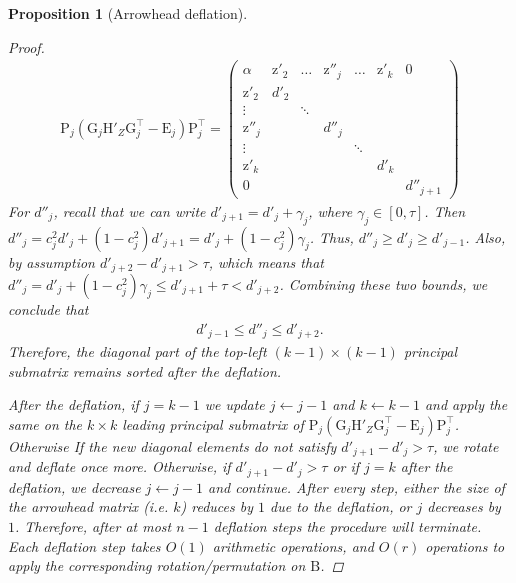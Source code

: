 \documentclass{article}
\newtheorem{proposition}{Proposition}[section]
\newcommand\vecz{\boldsymbol{\mathrm{z}}}
\newcommand\matB{\boldsymbol{\mathrm{B}}}
\newcommand\matE{\boldsymbol{\mathrm{E}}}
\newcommand\matG{\boldsymbol{\mathrm{G}}}
\newcommand\matH{\boldsymbol{\mathrm{H}}}
\newcommand\matP{\boldsymbol{\mathrm{P}}}
\begin{document}
\begin{proposition}[Arrowhead deflation]
\begin{proof}
        \begin{align*}
            \matP_{j}(\matG_j\matH'_Z\matG_j^\top - \matE_j)\matP_j^\top
            =
            \begin{pmatrix}
                \alpha & \vecz'_2 & \ldots & \vecz''_j & \ldots & \vecz'_k & 0
                \\
                \vecz'_2 & d'_2 &  &  &  & &
                \\
                \vdots &  & \ddots &  &  & &
                \\
                \vecz''_j &  &  & d''_j & & &
                \\
                \vdots &  &  &  &\ddots&   &
                \\
                \vecz'_{k} &  &  &  &&d'_{k} &
                \\
                0 &  &  &  & & & d''_{j+1}
            \end{pmatrix}
        \end{align*}
        For $d''_j$, recall that we can write $d'_{j+1}=d'_j+\gamma_j$, where $\gamma_j\in[0,\tau]$. Then $d''_j = c_j^2 d'_j + (1-c_j^2)d'_{j+1} = d'_j+(1-c_j^2)\gamma_j$. 
        Thus, $d''_j\geq d'_j\geq d'_{j-1}$. Also, by assumption $d'_{j+2}-d'_{j+1}>\tau$, which means that $d''_j =  d'_j+(1-c_j^2)\gamma_j \leq d'_{j+1}+\tau < d'_{j+2}$. Combining these two bounds, we conclude that \begin{align*}
            d'_{j-1}\leq d''_{j} \leq d'_{j+2}.
        \end{align*}
        Therefore, the diagonal part of the top-left $(k-1)\times(k-1)$ principal submatrix remains sorted after the deflation.
        
        After the deflation, if $j=k-1$ we update $j\leftarrow j-1$ and $k\leftarrow k-1$ and apply the same on the $k\times k$ leading principal submatrix of $\matP_{j}(\matG_j\matH'_Z\matG_j^\top - \matE_j)\matP_j^\top$. Otherwise  If the new diagonal elements do not satisfy $d'_{j+1}-d'_j>\tau$, we rotate and deflate once more. Otherwise, if $d'_{j+1}-d'_j>\tau$ or if $j=k$ after the deflation, we decrease $j\leftarrow j-1$ and continue. After every step, either the size of the arrowhead matrix (i.e. $k$) reduces by $1$ due to the deflation, or $j$ decreases by $1$. Therefore, after at most $n-1$ deflation steps the procedure will terminate. Each deflation step takes $O(1)$ arithmetic operations, and $O(r)$ operations to apply the corresponding rotation/permutation on $\matB$.


\end{proof}
\end{proposition}
\end{document}
